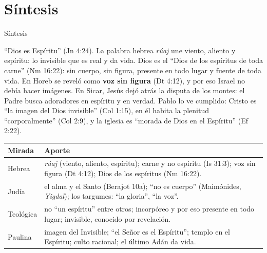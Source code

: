 \documentclass[hyperref={bookmarks=false},aspectratio=169]{beamer}
\newcommand{\destacar}[1]{\textbf{\textcolor{azul}{#1}}}
\begin{document}
\section{Síntesis}

\begin{frame}{Síntesis}
\begin{tcolorbox}[colback=papiro,colframe=azul,boxrule=1pt,arc=3pt]
\footnotesize ``Dios es Espíritu'' (Jn 4:24). La palabra hebrea \emph{rúaj} une viento, aliento y espíritu: lo invisible que es real y da vida. Dios es el ``Dios de los espíritus de toda carne'' (Nm 16:22): sin cuerpo, sin figura, presente en todo lugar y fuente de toda vida. En Horeb se reveló como \destacar{voz sin figura} (Dt 4:12), y por eso Israel no debía hacer imágenes. En Sicar, Jesús dejó atrás la disputa de los montes: el Padre busca adoradores en espíritu y en verdad. Pablo lo ve cumplido: Cristo es ``la imagen del Dios invisible'' (Col 1:15), en él habita la plenitud ``corporalmente'' (Col 2:9), y la iglesia es ``morada de Dios en el Espíritu'' (Ef 2:22).
\end{tcolorbox}
\scriptsize\renewcommand{\arraystretch}{1.15}
\begin{tabular}{@{}>{\RaggedRight\arraybackslash}p{2.4cm}>{\RaggedRight\arraybackslash}p{9.4cm}@{}}
\toprule
\textbf{Mirada} & \textbf{Aporte} \\ \midrule
Hebrea & \emph{rúaj} (viento, aliento, espíritu); carne y no espíritu (Is 31:3); voz sin figura (Dt 4:12); Dios de los espíritus (Nm 16:22). \\
Judía & el alma y el Santo (Berajot 10a); ``no es cuerpo'' (Maimónides, \emph{Yigdal}); los targumes: ``la gloria'', ``la voz''. \\
Teológica & no ``un espíritu'' entre otros; incorpóreo y por eso presente en todo lugar; invisible, conocido por revelación. \\
Paulina & imagen del Invisible; ``el Señor es el Espíritu''; templo en el Espíritu; culto racional; el último Adán da vida. \\
\bottomrule
\end{tabular}
\end{frame}
\end{document}
